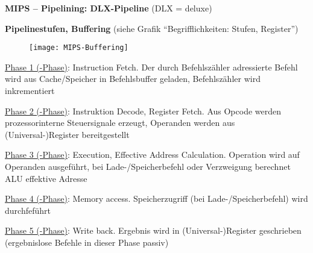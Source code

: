 \textbf{MIPS -- Pipelining: DLX-Pipeline} (DLX = deluxe)
\begin{items}
  \item \textbf{Pipelinestufen, Buffering} (siehe Grafik "`Begrifflichkeiten: Stufen, Register"')
  \begin{figure}[H]\centering\label{MIPS-Buffering}\texttt{[image: MIPS-Buffering]}\end{figure}
  \begin{enumeration}
    \item \underline{Phase 1 (-Phase)}: Instruction Fetch. Der durch Befehlszähler adressierte Befehl wird aus Cache/Speicher in Befehlsbuffer geladen, Befehlszähler wird inkrementiert
    \item \underline{Phase 2 (-Phase)}: Instruktion Decode, Register Fetch. Aus Opcode werden prozessorinterne Steuersignale erzeugt, Operanden werden aus (Universal-)Register bereitgestellt
    \item \underline{Phase 3 (-Phase)}: Execution, Effective Address Calculation. Operation wird auf Operanden ausgeführt, bei Lade-/Speicherbefehl oder Verzweigung berechnet ALU effektive Adresse
    \item \underline{Phase 4 (-Phase)}: Memory access. Speicherzugriff (bei Lade-/Speicherbefehl) wird durchfeführt
    \item \underline{Phase 5 (-Phase)}: Write back. Ergebnis wird in (Universal-)Register geschrieben (ergebnislose Befehle in dieser Phase passiv)
  \end{enumeration}
\end{items}